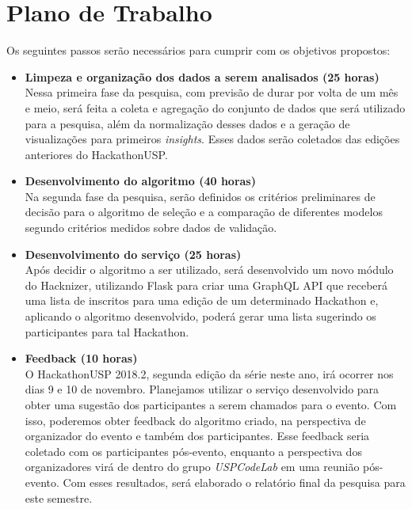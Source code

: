 \documentclass[10pt,twoside,a4paper]{article}
\begin{document}
\section{Plano de Trabalho}
  
  Os seguintes passos serão necessários para cumprir com os objetivos propostos:

  \begin{itemize}
    \item \textbf{Limpeza e organização dos dados a serem analisados (25 horas)} \\
        Nessa primeira fase da pesquisa, com previsão de durar por volta de um mês e meio, será feita a coleta e agregação do conjunto de dados que será utilizado para a pesquisa, além da normalização desses dados e a geração de visualizações para primeiros \textit{insights}. Esses dados serão coletados das edições anteriores do HackathonUSP.
    
    \item \textbf{Desenvolvimento do algoritmo (40 horas)} \\
        Na segunda fase da pesquisa, serão definidos os critérios preliminares de decisão para o algoritmo de seleção e a comparação de diferentes modelos segundo critérios medidos sobre dados de validação.
          
    \item \textbf{Desenvolvimento do serviço (25 horas)} \\
        Após decidir o algoritmo a ser utilizado, será desenvolvido um novo módulo do Hacknizer, utilizando Flask para criar uma GraphQL API que receberá uma lista de inscritos para uma edição de um determinado Hackathon e, aplicando o algoritmo desenvolvido, poderá gerar uma lista sugerindo os participantes para tal Hackathon. 
    
    \item \textbf{Feedback (10 horas)} \\
        O HackathonUSP 2018.2, segunda edição da série neste ano, irá ocorrer nos dias 9 e 10 de novembro. Planejamos utilizar o serviço desenvolvido para obter uma sugestão dos participantes a serem chamados para o evento. Com isso, poderemos obter feedback do algoritmo criado, na perspectiva de organizador do evento e também dos participantes. Esse feedback seria coletado com os participantes pós-evento, enquanto a perspectiva dos organizadores virá de dentro do grupo \textit{USPCodeLab} em uma reunião pós-evento. Com esses resultados, será elaborado o relatório final da pesquisa para este semestre.

  \end{itemize}
\end{document}
